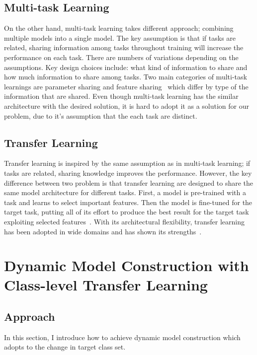 \documentclass{article}
\begin{document}
\subsection{Multi-task Learning}
On the other hand, multi-task learning takes different approach; combining multiple models into a single model. The key assumption is that if tasks are related, sharing information among tasks throughout training will increase the performance on each task. There are numbers of variations depending on the assumptions. Key design choices include: what kind of information to share and how much information to share among tasks. Two main categories of multi-task learnings are parameter sharing and feature sharing~\cite{ruder2017overview, Caruana1993MultitaskLA, duong2015low, lu2017fully} which differ by type of the information that are shared. Even though multi-task learning has the similar architecture with the desired solution, it is hard to adopt it as a solution for our problem, due to it's assumption that the each task are distinct.

\subsection{Transfer Learning}

Transfer learning is inspired by the same assumption as in multi-task learning; if tasks are related, sharing knowledge improves the performance. However, the key difference between two problem is that transfer learning are designed to share the same model architecture for different tasks. First, a model is pre-trained with a task and learns to select important features. Then the model is fine-tuned for the target task, putting all of its effort to produce the best result for the target task exploiting selected features~\cite{yosinski2014transferable}. With its architectural flexibility, transfer learning has been adopted in wide domains and has shown its strengths~\cite{raina2007self, egan2004effects, glorot2011domain}.

\section{Dynamic Model Construction with Class-level Transfer Learning}

\subsection{Approach}

In this section, I introduce how to achieve dynamic model construction which adopts to the change in target class set.
\end{document}
